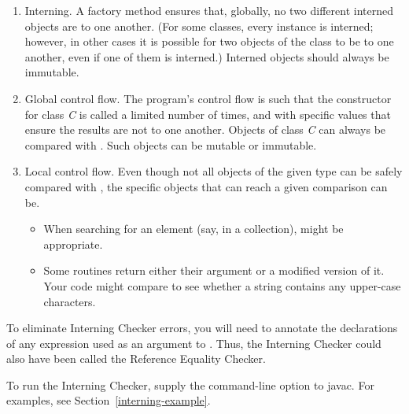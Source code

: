 \begin{enumerate}
\item
  Interning.  A factory method ensures that, globally, no two different
  interned objects are  to one another.
  (For some classes, every instance is interned; however, in other cases it is
  possible for two objects of the class to be
   to one another, even if one of them is interned.)
  Interned objects should always be immutable.
\item
  Global control flow.  The program's control flow is such that the
  constructor for class \textit{C} is called a limited number of times, and with
  specific values that ensure the results are not  to one
  another.  Objects of class \textit{C} can always be compared with \code{==}.
  Such objects can be mutable or immutable.
\item
  Local control flow.  Even though not all objects of the given type can be
  safely compared with \code{==}, the specific objects that can reach a given
  comparison can be.
  \begin{itemize}
  \item
    When searching for an element (say, in a collection), \code{==} might be
    appropriate.
  \item
    Some routines return either their argument or a modified version of
    it.  Your code might compare  to see whether
    a string contains any upper-case characters.
  \end{itemize}
\end{enumerate}

To eliminate Interning Checker errors, you will need to annotate the
declarations of any expression used as an argument to \code{==}.
Thus, the Interning Checker
could also have been called the Reference Equality Checker.

\begin{sloppypar}
To run the Interning Checker, supply the
command-line option to javac.  For examples, see Section~\ref{interning-example}.
\end{sloppypar}



